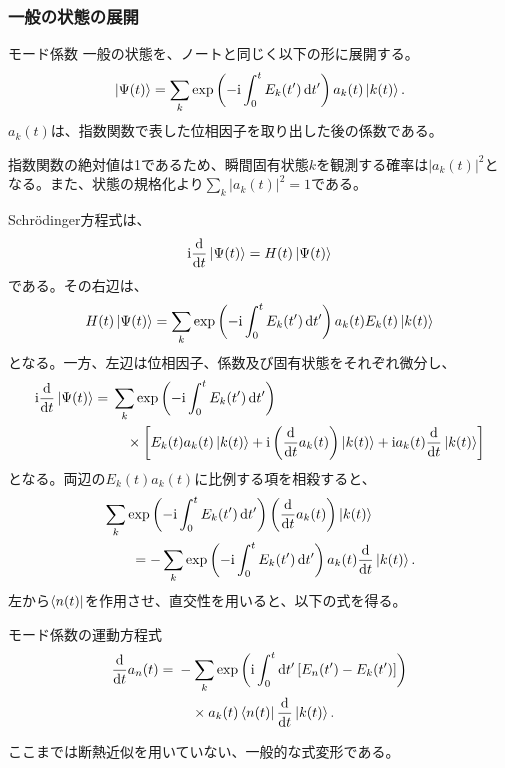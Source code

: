 \documentclass[a4paper,10.5pt]{article}
\numberwithin{equation}{section}
\providecommand{\ii}{\mathrm{i}}
\begin{document}
\subsubsection{一般の状態の展開}
\begin{defbox}{モード係数}
一般の状態を、ノートと同じく以下の形に展開する。
\begin{align}
\ket{\Psi(t)}
=\sum_k
\exp\left(-\ii\int_0^t E_k(t')\,\dd t'\right)
a_k(t)\ket{k(t)}.
\label{eq:expansion}
\end{align}
$a_k(t)$は、指数関数で表した位相因子を取り出した後の係数である。
\end{defbox}
指数関数の絶対値は1であるため、瞬間固有状態$k$を観測する確率は$|a_k(t)|^2$となる。また、状態の規格化より$\sum_k|a_k(t)|^2=1$である。

Schrödinger方程式は、
\begin{align}
\ii\frac{\dd}{\dd t}\ket{\Psi(t)}=H(t)\ket{\Psi(t)}
\end{align}
である。その右辺は、
\begin{align}
H(t)\ket{\Psi(t)}
=\sum_k\exp\left(-\ii\int_0^t E_k(t')\,\dd t'\right)
a_k(t)E_k(t)\ket{k(t)}
\end{align}
となる。一方、左辺は位相因子、係数及び固有状態をそれぞれ微分し、
\begin{align}
\ii\frac{\dd}{\dd t}\ket{\Psi(t)}
={}&\sum_k\exp\left(-\ii\int_0^t E_k(t')\,\dd t'\right)
\notag\\
&\quad\times\left[
E_k(t)a_k(t)\ket{k(t)}
+\ii\left(\frac{\dd}{\dd t}a_k(t)\right)\ket{k(t)}
+\ii a_k(t)\frac{\dd}{\dd t}\ket{k(t)}
\right]
\end{align}
となる。両辺の$E_k(t)a_k(t)$に比例する項を相殺すると、
\begin{align}
&\sum_k\exp\left(-\ii\int_0^t E_k(t')\,\dd t'\right)
\left(\frac{\dd}{\dd t}a_k(t)\right)\ket{k(t)}
\notag\\
&\qquad=
-\sum_k\exp\left(-\ii\int_0^t E_k(t')\,\dd t'\right)
a_k(t)\frac{\dd}{\dd t}\ket{k(t)}.
\end{align}
左から$\bra{n(t)}$を作用させ、直交性を用いると、以下の式を得る。
\begin{resultbox}{モード係数の運動方程式}
\begin{align}
\frac{\dd}{\dd t}a_n(t)
={}&-\sum_k
\exp\left(\ii\int_0^t\dd t'\,[E_n(t')-E_k(t')]\right)
\notag\\
&\quad\times a_k(t)\bra{n(t)}\frac{\dd}{\dd t}\ket{k(t)}.
\label{eq:coeff-general}
\end{align}
\end{resultbox}
ここまでは断熱近似を用いていない、一般的な式変形である。
\end{document}

